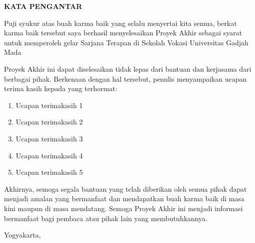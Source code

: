 \clearpage
{}
{}
\begin{center}
    \textbf{\large KATA PENGANTAR}\\[3em]
\end{center}


Puji syukur atas buah karma baik yang selalu menyertai kita semua, berkat karma baik tersebut saya berhasil menyelesaikan Proyek Akhir sebagai syarat untuk memperoleh gelar Sarjana Terapan di Sekolah Vokasi Universitas Gadjah Mada

Proyek Akhir ini dapat diselesaikan tidak lepas dari bantuan dan kerjasama dari berbagai pihak. Berkenaan dengan hal tersebut, penulis menyampaikan ucapan terima kasih kepada yang terhormat:

\begin{enumerate}
    \item Ucapan terimakasih 1
    \item Ucapan terimakasih 2
    \item Ucapan terimakasih 3
    \item Ucapan terimakasih 4
    \item Ucapan terimakasih 5
\end{enumerate}

Akhirnya, semoga segala bantuan yang telah diberikan oleh semua pihak dapat menjadi amalan yang bermanfaat dan mendapatkan buah karma baik di masa kini maupun di masa mendatang. Semoga Proyek Akhir ini menjadi informasi bermanfaat bagi pembaca atau pihak lain yang membutuhkannya.

\begin{flushright}
    Yogyakarta, \tglpengesahan\\[1.25cm]
    \penulis \\
    \nim
\end{flushright}